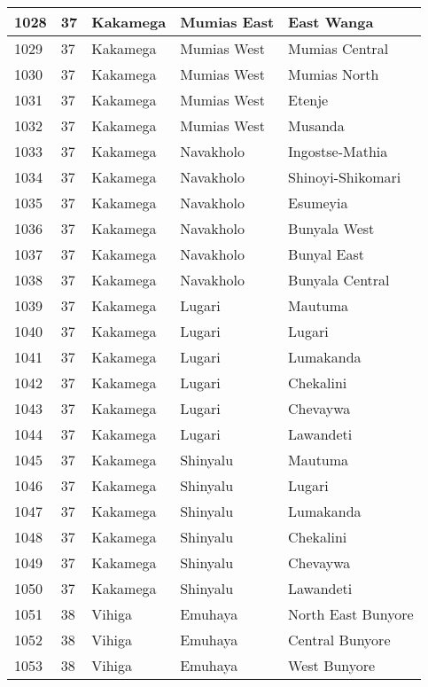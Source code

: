 \begin{table}[!ht]
\begin{tabular}{|l|l|l|l|l|}
        1028 & 37 & Kakamega & Mumias East & East Wanga \\ \hline
        1029 & 37 & Kakamega & Mumias West & Mumias Central \\ \hline
        1030 & 37 & Kakamega & Mumias West & Mumias North \\ \hline
        1031 & 37 & Kakamega & Mumias West & Etenje \\ \hline
        1032 & 37 & Kakamega & Mumias West & Musanda \\ \hline
        1033 & 37 & Kakamega & Navakholo & Ingostse-Mathia \\ \hline
        1034 & 37 & Kakamega & Navakholo & Shinoyi-Shikomari \\ \hline
        1035 & 37 & Kakamega & Navakholo & Esumeyia \\ \hline
        1036 & 37 & Kakamega & Navakholo & Bunyala West \\ \hline
        1037 & 37 & Kakamega & Navakholo & Bunyal East \\ \hline
        1038 & 37 & Kakamega & Navakholo & Bunyala Central \\ \hline
        1039 & 37 & Kakamega & Lugari & Mautuma \\ \hline
        1040 & 37 & Kakamega & Lugari & Lugari \\ \hline
        1041 & 37 & Kakamega & Lugari & Lumakanda \\ \hline
        1042 & 37 & Kakamega & Lugari & Chekalini \\ \hline
        1043 & 37 & Kakamega & Lugari & Chevaywa \\ \hline
        1044 & 37 & Kakamega & Lugari & Lawandeti \\ \hline
        1045 & 37 & Kakamega & Shinyalu & Mautuma \\ \hline
        1046 & 37 & Kakamega & Shinyalu & Lugari \\ \hline
        1047 & 37 & Kakamega & Shinyalu & Lumakanda \\ \hline
        1048 & 37 & Kakamega & Shinyalu & Chekalini \\ \hline
        1049 & 37 & Kakamega & Shinyalu & Chevaywa \\ \hline
        1050 & 37 & Kakamega & Shinyalu & Lawandeti \\ \hline
        1051 & 38 & Vihiga & Emuhaya & North East Bunyore \\ \hline
        1052 & 38 & Vihiga & Emuhaya & Central Bunyore \\ \hline
        1053 & 38 & Vihiga & Emuhaya & West Bunyore \\ \hline

\end{tabular}
\end{table}
